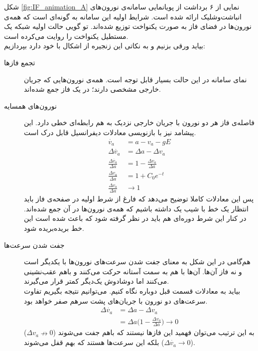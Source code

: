 شکل
\ref{fig:IF_animation_A}
نمایی از ۶ برداشت از پویانمایی سامانه‌ی نورون‌های انباشت‌وشلیک ارائه شده است. شرایط اولیه این سامانه به گونه‌ای است که همه‌ی نورون‌ها در فضای فاز به صورت یکنواخت توزیع شده‌اند. تو گویی حالت اولیه شبکه یک مستطیل یکنواخت را روایت می‌کرده است.\\
بیاید ورقی بزنیم و به نکاتی این زنجیره از اشکال با خود دارد بپردازیم:
\begin{description}
	\item[تجمع فازها] 
	نمای سامانه در این حالت بسیار قابل توجه است. همه‌ی نورون‌هایی که جریان خارجی مشخصی دارند؛ در یک فاز جمع شده‌اند.
	\item[نورون‌های همسایه] 
	 فاصله‌ی فاز هر دو نورون با جریان خارجی نزدیک به هم رابطه‌ای خطی دارد. این پیشامد نیز با بازنویسی معادلات دیفرانسیل قابل درک است.
	 \begin{align}
	 	\dot{v_a} &= a - v_a - g E\\
	 	\Delta\dot{v_a} &= \Delta a - \Delta v_a\\
	 	\frac{\Delta\dot{v_a}}{\Delta a} &= 1 - \frac{\Delta v_a}{\Delta a}\\
		\frac{\Delta v_a}{\Delta a} &= 1 + C_0 e^{-t}\\
		\frac{\Delta v_a}{\Delta a} &\rightarrow 1
	 \end{align}
 پس این معادلات کاملا توضیح می‌دهد که فارغ از شرط اولیه در صفحه‌ی فاز باید انتظار یک خط با شیب یک داشته باشیم که همه‌ی نورون‌ها در آن جمع شده‌اند. در کنار این شرط دوره‌ای هم باید در نظر گرفته شود که باعث شده است این خط بریده‌بریده شود.
 	\item[جفت شدن سرعت‌ها]
 	هم‌گامی در این شکل به معنای جفت شدن سرعت‌های نورون‌ها با یکدیگر است و نه فاز آن‌ها. آن‌ها با هم به سمت آستانه حرکت می‌کنند و باهم عقب‌نشینی می‌کنند اما دوشادوش یک‌دیگر کمتر قرار می‌گیرند.\\
 	بیاید به معادلات قسمت قبل دوباره نگاه کنیم. می‌توانیم نتیجه بگیریم تفاوت سرعت‌های دو نورون با جریان‌های پشت سرهم صفر خواهد بود.
 	\begin{align}
 		\Delta\dot{v_a} &= \Delta a - \Delta v_a\\
 		&= \Delta a \big(1 - \frac{\Delta v_a}{\Delta a} \big) \rightarrow 0
 	\end{align}
 	به این ترتیب می‌توان فهمید این فازها نیستند که باهم جفت می‌شوند 
 	($\Delta v_a \nrightarrow 0 $)
 	بلکه این سرعت‌ها هستند که بهم قفل می‌شوند
 	($\Delta \dot{v_a} \rightarrow 0 $).
\end{description}

